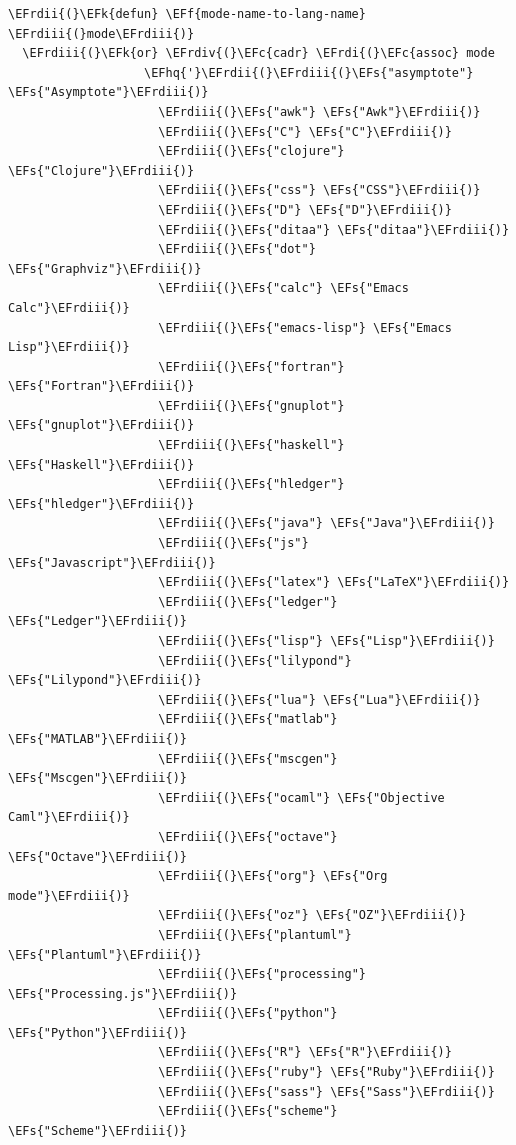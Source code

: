 \documentclass{scrartcl}
\newcommand{\EFk}[1]{\textcolor{EFk}{#1}} %
\newcommand{\EFs}[1]{\textcolor{EFs}{#1}} %
\newcommand{\EFc}[1]{\textcolor{EFc}{#1}} %
\newcommand{\EFf}[1]{\textcolor{EFf}{#1}} %
\newcommand{\EFhq}[1]{#1} %
\newcommand{\EFrdi}[1]{#1} %
\newcommand{\EFrdii}[1]{#1} %
\newcommand{\EFrdiii}[1]{#1} %
\newcommand{\EFrdiv}[1]{#1} %
\begin{document}
\begin{Code}
\begin{Verbatim}[]
\EFrdii{(}\EFk{defun} \EFf{mode-name-to-lang-name} \EFrdiii{(}mode\EFrdiii{)}
  \EFrdiii{(}\EFk{or} \EFrdiv{(}\EFc{cadr} \EFrdi{(}\EFc{assoc} mode
                   \EFhq{'}\EFrdii{(}\EFrdiii{(}\EFs{"asymptote"} \EFs{"Asymptote"}\EFrdiii{)}
                     \EFrdiii{(}\EFs{"awk"} \EFs{"Awk"}\EFrdiii{)}
                     \EFrdiii{(}\EFs{"C"} \EFs{"C"}\EFrdiii{)}
                     \EFrdiii{(}\EFs{"clojure"} \EFs{"Clojure"}\EFrdiii{)}
                     \EFrdiii{(}\EFs{"css"} \EFs{"CSS"}\EFrdiii{)}
                     \EFrdiii{(}\EFs{"D"} \EFs{"D"}\EFrdiii{)}
                     \EFrdiii{(}\EFs{"ditaa"} \EFs{"ditaa"}\EFrdiii{)}
                     \EFrdiii{(}\EFs{"dot"} \EFs{"Graphviz"}\EFrdiii{)}
                     \EFrdiii{(}\EFs{"calc"} \EFs{"Emacs Calc"}\EFrdiii{)}
                     \EFrdiii{(}\EFs{"emacs-lisp"} \EFs{"Emacs Lisp"}\EFrdiii{)}
                     \EFrdiii{(}\EFs{"fortran"} \EFs{"Fortran"}\EFrdiii{)}
                     \EFrdiii{(}\EFs{"gnuplot"} \EFs{"gnuplot"}\EFrdiii{)}
                     \EFrdiii{(}\EFs{"haskell"} \EFs{"Haskell"}\EFrdiii{)}
                     \EFrdiii{(}\EFs{"hledger"} \EFs{"hledger"}\EFrdiii{)}
                     \EFrdiii{(}\EFs{"java"} \EFs{"Java"}\EFrdiii{)}
                     \EFrdiii{(}\EFs{"js"} \EFs{"Javascript"}\EFrdiii{)}
                     \EFrdiii{(}\EFs{"latex"} \EFs{"LaTeX"}\EFrdiii{)}
                     \EFrdiii{(}\EFs{"ledger"} \EFs{"Ledger"}\EFrdiii{)}
                     \EFrdiii{(}\EFs{"lisp"} \EFs{"Lisp"}\EFrdiii{)}
                     \EFrdiii{(}\EFs{"lilypond"} \EFs{"Lilypond"}\EFrdiii{)}
                     \EFrdiii{(}\EFs{"lua"} \EFs{"Lua"}\EFrdiii{)}
                     \EFrdiii{(}\EFs{"matlab"} \EFs{"MATLAB"}\EFrdiii{)}
                     \EFrdiii{(}\EFs{"mscgen"} \EFs{"Mscgen"}\EFrdiii{)}
                     \EFrdiii{(}\EFs{"ocaml"} \EFs{"Objective Caml"}\EFrdiii{)}
                     \EFrdiii{(}\EFs{"octave"} \EFs{"Octave"}\EFrdiii{)}
                     \EFrdiii{(}\EFs{"org"} \EFs{"Org mode"}\EFrdiii{)}
                     \EFrdiii{(}\EFs{"oz"} \EFs{"OZ"}\EFrdiii{)}
                     \EFrdiii{(}\EFs{"plantuml"} \EFs{"Plantuml"}\EFrdiii{)}
                     \EFrdiii{(}\EFs{"processing"} \EFs{"Processing.js"}\EFrdiii{)}
                     \EFrdiii{(}\EFs{"python"} \EFs{"Python"}\EFrdiii{)}
                     \EFrdiii{(}\EFs{"R"} \EFs{"R"}\EFrdiii{)}
                     \EFrdiii{(}\EFs{"ruby"} \EFs{"Ruby"}\EFrdiii{)}
                     \EFrdiii{(}\EFs{"sass"} \EFs{"Sass"}\EFrdiii{)}
                     \EFrdiii{(}\EFs{"scheme"} \EFs{"Scheme"}\EFrdiii{)}

\end{Verbatim}
\end{Code}
\end{document}
